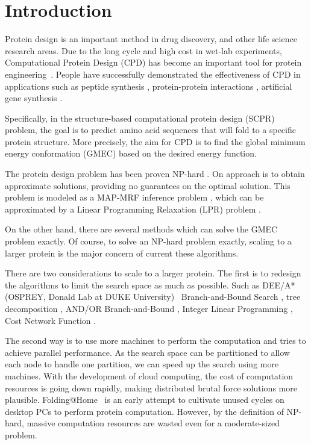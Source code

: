 \section{Introduction}

Protein design is an important method in drug discovery,  and
other life science research areas. Due to the long cycle and high cost in
wet-lab experiments, Computational Protein Design (CPD) has become an important
tool for protein engineering~\cite[]{alvizo2007computational}. People have
successfully demonstrated the effectiveness of CPD in applications such as
peptide synthesis \cite[]{ottl1996design}, protein-protein interactions
\cite[]{roberts2012computational}, artificial gene synthesis
\cite[]{villalobos2006gene}.

 Specifically, in the
structure-based computational protein design (SCPR) problem, the goal is to
predict amino acid sequences that will fold to a specific protein structure.
More precisely, the aim for CPD is to find the global minimum energy
conformation (GMEC) based on the desired energy function.

The protein design problem has been proven NP-hard \cite[]{pierce2002protein}.
On approach is to obtain approximate solutions, providing no guarantees on the
optimal solution. This problem is modeled as a MAP-MRF inference problem
\cite[]{yanover2006linear}, which can be approximated by a Linear Programming
Relaxation (LPR) problem \cite[]{wainwright2005map}.

On the other hand, there are several methods which can solve the GMEC problem
exactly. Of course, to solve an NP-hard problem exactly, scaling to a larger
protein is the major concern of current these algorithms.

There are two considerations to scale to a larger protein. The first is to
redesign the algorithms to limit the search space as much as possible. Such as
DEE/A* (OSPREY, Donald Lab at DUKE University)~ Branch-and-Bound Search
\cite[]{hong2006protein}, tree decomposition \cite[]{xu2006fast}, AND/OR
Branch-and-Bound \cite[]{marinescu2009and}, Integer Linear Programming
\cite[]{kingsford2005solving}, Cost Network Function \cite[]{traore2013new}.

The second way is to use more machines to perform the computation and tries to
achieve parallel performance. As the search space can be partitioned to allow
each node to handle one partition, we can speed up the search using more
machines. With the development of cloud computing, the cost of computation
resources is going down rapidly, making distributed brutal force solutions more
plausible. Folding@Home~\cite{} is an early attempt to cultivate unused cycles
on desktop PCs to perform protein computation. However, by the definition of
NP-hard, massive computation resources are wasted even for a moderate-sized
problem.

